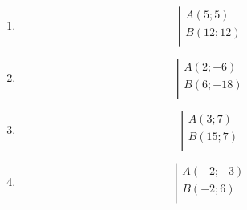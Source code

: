 \begin{exercice}
\begin{multicols}{2}
\begin{enumerate}
\item $$\left| \begin{array}{l}
 A(5;5) \\ 
B\left( 12;12 \right) \\ 
\end{array} \right.$$
\item $$\left| \begin{array}{l}
 A(2;-6) \\ 
B\left( 6;-18 \right) \\ 
\end{array} \right.$$
\item $$\left| \begin{array}{l}
 A(3;7) \\ 
B\left( 15;7 \right) \\ 
\end{array} \right.$$
\item $$\left| \begin{array}{l}
 A(-2;-3) \\ 
B\left( -2;6 \right) \\ 
\end{array} \right.$$
\end{enumerate}
\end{multicols}
\end{exercice}

